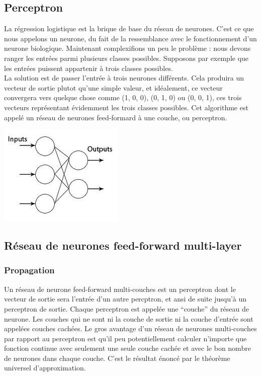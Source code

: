 \subsection{Perceptron}

La régression logistique est la brique de base du réseau de neurones. C'est ce que nous appelons un neurone, du fait de la ressemblance avec le fonctionnement d'un neurone biologique. Maintenant complexifions un peu le problème : nous devons ranger les entrées parmi plusieurs classes possibles. Supposons par exemple que les entrées puissent appartenir à trois classes possibles.\\
La solution est de passer l'entrée à trois neurones différents. Cela produira un vecteur de sortie plutot qu'une simple valeur, et idéalement, ce vecteur convergera vers quelque chose comme (1, 0, 0), (0, 1, 0) ou (0, 0, 1), ces trois vecteurs représentant évidemment les trois classes possibles. Cet algorithme est appelé un réseau de neurones feed-formard à une couche, ou perceptron.\\
\begin{center}
\includegraphics[scale=0.7]{chapters/Pictures/perceptron.jpg}\\
\end{center}

\subsection{Réseau de neurones feed-forward multi-layer}
\subsubsection{Propagation}
Un réseau de neurone feed-forward multi-couches est un perceptron dont le vecteur de sortie sera l'entrée d'un autre percptron, et ansi de suite jusqu'à un perceptron de sortie. Chaque perceptron est appelée une ``couche'' du réseau de neurone. Les couches qui ne sont ni la couche de sortie ni la couche d'entrée sont appelées couches cachées. Le gros avantage d'un réseau de neurones multi-couches par rapport au perceptron est qu'il peu potentiellement calculer n'importe que fonction continue avec seulement une seule couche cachée et avec le bon nombre de neurones dans chaque couche. C'est le résultat énoncé par le théorème universel d'approximation.\\

